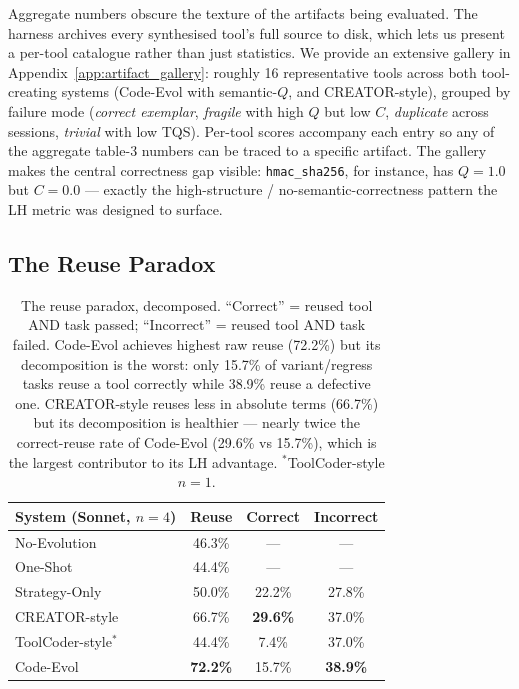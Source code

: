 \documentclass[sigplan,nonacm,natbib=false]{acmart}
\begin{document}
Aggregate numbers obscure the texture of the artifacts being evaluated. The harness archives every synthesised tool's full source to disk, which lets us present a per-tool catalogue rather than just statistics. We provide an extensive gallery in Appendix~\ref{app:artifact_gallery}: roughly 16 representative tools across both tool-creating systems (Code-Evol with semantic-$Q$, and CREATOR-style), grouped by failure mode (\emph{correct exemplar}, \emph{fragile} with high $Q$ but low $C$, \emph{duplicate} across sessions, \emph{trivial} with low TQS). Per-tool scores accompany each entry so any of the aggregate table-3 numbers can be traced to a specific artifact. The gallery makes the central correctness gap visible: \texttt{hmac\_sha256}, for instance, has $Q{=}1.0$ but $C{=}0.0$ --- exactly the high-structure / no-semantic-correctness pattern the LH metric was designed to surface.

\subsection{The Reuse Paradox}
\label{sec:reuse_analysis}

\begin{table}[t]
\centering
\footnotesize
\begin{tabular}{lccc}
\toprule
\textbf{System (Sonnet, $n{=}4$)} & \textbf{Reuse} & \textbf{Correct} & \textbf{Incorrect} \\
\midrule
No-Evolution     & 46.3\% & --- & --- \\
One-Shot         & 44.4\% & --- & --- \\
Strategy-Only    & 50.0\% & 22.2\% & 27.8\% \\
\midrule
CREATOR-style    & 66.7\% & \textbf{29.6\%} & 37.0\% \\
ToolCoder-style$^*$ & 44.4\% & 7.4\% & 37.0\% \\
Code-Evol        & \textbf{72.2\%} & 15.7\% & \textbf{38.9\%} \\
\bottomrule
\end{tabular}
\caption{The reuse paradox, decomposed. ``Correct'' = reused tool AND task passed; ``Incorrect'' = reused tool AND task failed. Code-Evol achieves highest raw reuse (72.2\%) but its decomposition is the worst: only 15.7\% of variant/regress tasks reuse a tool correctly while 38.9\% reuse a defective one. CREATOR-style reuses less in absolute terms (66.7\%) but its decomposition is healthier --- nearly twice the correct-reuse rate of Code-Evol (29.6\% vs 15.7\%), which is the largest contributor to its LH advantage. $^*$ToolCoder-style $n{=}1$.}
\label{tab:reuse}
\end{table}
\end{document}
